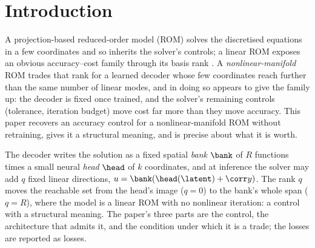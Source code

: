 \section{Introduction}
\label{sec:intro}

A projection-based reduced-order model (ROM) solves the discretised equations in
a few coordinates and so inherits the solver's controls; a linear ROM exposes an
obvious accuracy--cost family through its basis rank
\citep{BennerGugercinWillcox2015}. A \emph{nonlinear-manifold} ROM
\citep{LeeCarlberg2020,KimChoi2022NMROM} trades that rank for a learned decoder
whose few coordinates reach further than the same number of linear modes, and
in doing so appears to give the family up: the decoder is fixed once trained,
and the solver's remaining controls (tolerance, iteration budget) move cost far
more than they move accuracy. This paper recovers an accuracy control for a
nonlinear-manifold ROM without retraining, gives it a structural meaning, and is
precise about what it is worth.

The decoder writes the solution as a fixed spatial \emph{bank} $\bank$ of $R$
functions times a small neural \emph{head} $\head$ of $k$ coordinates, and at
inference the solver may add $q$ fixed linear directions,
$u=\bank(\head(\latent)+\corr y)$. The rank $q$ moves the reachable set from
the head's image ($q=0$) to the bank's whole span ($q=R$), where the model is a
linear ROM with no nonlinear iteration: a control with a structural meaning.
The paper's three parts are the control, the architecture that admits it, and
the condition under which it is a trade; the losses are reported as losses.


